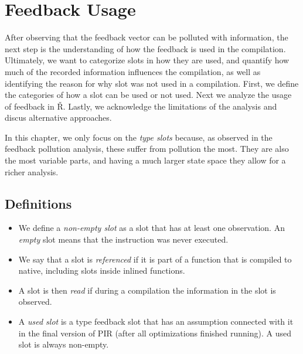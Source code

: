 \chapter{Feedback Usage}

\begin{chapterabstract}
	After observing that the feedback vector can be polluted with information, the next step is the understanding of how the feedback is used in the compilation. Ultimately, we want to categorize slots in how they are used, and quantify how much of the recorded information influences the compilation, as well as identifying the reason for why slot was not used in a compilation. First, we define the categories of how a slot can be used or not used. Next we analyze the usage of feedback in Ř. Lastly, we acknowledge the limitations of the analysis and discus alternative approaches.
\end{chapterabstract}

In this chapter, we only focus on the \textit{type slots} because, as observed in the feedback pollution analysis, these suffer from pollution the most. They are also the most variable parts, and having a much larger state space they allow for a richer analysis.

\section{Definitions}

\begin{itemize}
	\item{} We define a \textit{non-empty slot} as a slot that has at least one observation. An \textit{empty} slot means that the instruction was never executed.
	\item{} We say that a slot is \textit{referenced} if it is part of a function that is compiled to native, including slots inside inlined functions.
	\item{} A slot is then \textit{read} if during a compilation the information in the slot is observed.
	\item{} A \textit{used slot} is a type feedback slot that has an assumption connected with it in the final version of PIR (after all optimizations finished running). A used slot is always non-empty.
\end{itemize}


